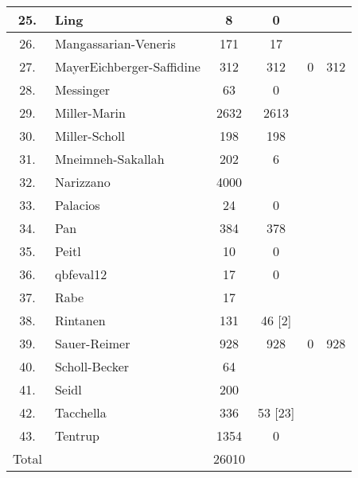 \documentclass[runningheads]{llncs}
\begin{document}
\begin{table}
\begin{tabular}{c|l|c|c|c|c}
25. & Ling &  8 & 0 &  &  \\ \hline

26. & Mangassarian-Veneris &  171 & 17 &  &  \\ \hline

27. & MayerEichberger-Saffidine &  312 & 312 & 0 & 312 \\\hline

28. & Messinger &  63 & 0 &  &  \\ \hline

29. & Miller-Marin & 2632 & 2613 &  &  \\ \hline

30. & Miller-Scholl & 198 & 198 &  &  \\ \hline

31. & Mneimneh-Sakallah &  202 & 6 &  &  \\ \hline

32. & Narizzano &  4000 & &  &  \\ \hline 

33. & Palacios & 24 & 0 &  &  \\ \hline

34. & Pan &  384 & 378 &  &  \\ \hline

35. & Peitl & 10 & 0 &  &  \\\hline

36. & qbfeval12 & 17 & 0 &  &  \\ \hline

37. & Rabe &  17 &  &   \\ \hline

38. & Rintanen &  131 & 46 [2] &  &  \\\hline

39. & Sauer-Reimer &  928 & 928 & 0 & 928 \\ \hline

40. & Scholl-Becker & 64 &  &  &  \\ \hline

41. & Seidl &  200 &  &  &  \\ \hline

42. & Tacchella &  336 & 53 [23] &  &  \\ \hline 

43. & Tentrup & 1354 & 0  &  &  \\ \hline \hline

Total &  & 26010 &  &  &  \\  \hline \hline
 

\hline
\end{tabular}
\end{table}
\end{document}
